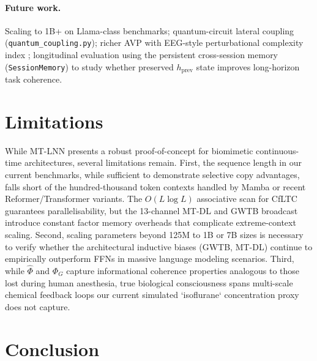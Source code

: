 \documentclass[11pt]{article}
\theoremstyle{definition}
\begin{document}
\paragraph{Future work.}
Scaling to 1B+ on Llama-class benchmarks; quantum-circuit lateral coupling (\texttt{quantum\_coupling.py}); richer AVP with EEG-style perturbational complexity index \citep{casali2013theoretically}; longitudinal evaluation using the persistent cross-session memory (\texttt{SessionMemory}) to study whether preserved $h_\text{prev}$ state improves long-horizon task coherence.
\section{Limitations}
\label{sec:limitations}

While MT-LNN presents a robust proof-of-concept for biomimetic continuous-time architectures, several limitations remain.
First, the sequence length in our current benchmarks, while sufficient to demonstrate selective copy advantages, falls short of the hundred-thousand token contexts handled by Mamba \citep{gu2023mamba} or recent Reformer/Transformer variants. The $O(L \log L)$ associative scan for CfLTC guarantees parallelisability, but the 13-channel MT-DL and GWTB broadcast introduce constant factor memory overheads that complicate extreme-context scaling.
Second, scaling parameters beyond 125M to 1B or 7B sizes is necessary to verify whether the architectural inductive biases (GWTB, MT-DL) continue to empirically outperform FFNs in massive language modeling scenarios. 
Third, while $\hat{\Phi}$ and $\Phi_G$ capture informational coherence properties analogous to those lost during human anesthesia, true biological consciousness spans multi-scale chemical feedback loops our current simulated `isoflurane` concentration proxy does not capture. 
\section{Conclusion}
\label{sec:conclusion}
\end{document}
